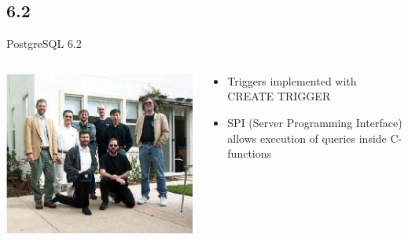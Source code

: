 \documentclass[t,10pt]{beamer}
\begin{document}
\subsection{6.2}
\begin{frame}{PostgreSQL 6.2}
  \begin{columns}[T]
    \begin{column}{0.3\textwidth}
      \includegraphics[width=1.1\textwidth,keepaspectratio=true]{assets/Get_to_know_PostgreSQL-6-team}
    \end{column}
    \begin{column}{0.7\textwidth}
      \begin{itemize}%
      \item Triggers implemented with CREATE TRIGGER
      \item SPI (Server Programming Interface) allows execution of queries inside C-functions
      \end{itemize}
    \end{column}
  \end{columns}
\end{frame}
\end{document}
